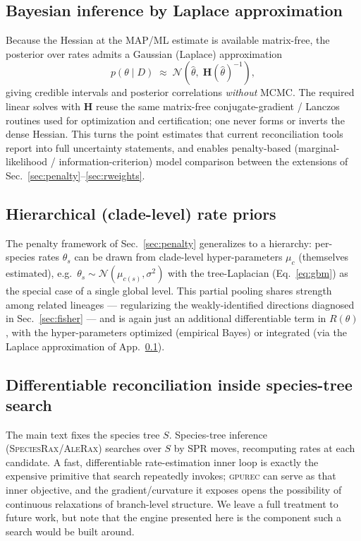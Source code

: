 \documentclass[11pt]{article}
\newcommand{\toolname}{\textsc{gpurec}\xspace}
\newcommand{\Hess}{\mathbf{H}}
\begin{document}
\subsection{Bayesian inference by Laplace approximation}
\label{app:laplace}
Because the Hessian at the MAP/ML estimate is available matrix-free, the
posterior over rates admits a Gaussian (Laplace) approximation
\begin{equation}
  p(\theta \mid D) \;\approx\; \mathcal{N}\!\left(\hat\theta,\; \Hess(\hat\theta)^{-1}\right),
  \label{eq:laplace}
\end{equation}
giving credible intervals and posterior correlations \emph{without} MCMC. The
required linear solves with $\Hess$ reuse the same matrix-free conjugate-gradient
/ Lanczos routines used for optimization and certification; one never forms or
inverts the dense Hessian. This turns the point estimates that current
reconciliation tools report into full uncertainty statements, and enables
penalty-based (marginal-likelihood / information-criterion) model comparison
between the extensions of Sec.~\ref{sec:penalty}--\ref{sec:rweights}.

\subsection{Hierarchical (clade-level) rate priors}
\label{app:hier}
The penalty framework of Sec.~\ref{sec:penalty} generalizes to a hierarchy:
per-species rates $\theta_s$ can be drawn from clade-level hyper-parameters
$\mu_c$ (themselves estimated), e.g.\ $\theta_s \sim \mathcal{N}(\mu_{c(s)},
\sigma^2)$ with the tree-Laplacian (Eq.~\eqref{eq:gbm}) as the special case of a
single global level. This partial pooling shares strength among related lineages
--- regularizing the weakly-identified directions diagnosed in
Sec.~\ref{sec:fisher} --- and is again just an additional differentiable term in
$R(\theta)$, with the hyper-parameters optimized (empirical Bayes) or integrated
(via the Laplace approximation of App.~\ref{app:laplace}).

\subsection{Differentiable reconciliation inside species-tree search}
\label{app:treesearch}
The main text fixes the species tree $S$. Species-tree inference
(\textsc{SpeciesRax}/\textsc{AleRax}) searches over $S$ by SPR moves, recomputing
rates at each candidate. A fast, differentiable rate-estimation inner loop is
exactly the expensive primitive that search repeatedly invokes; \toolname can
serve as that inner objective, and the gradient/curvature it exposes opens the
possibility of continuous relaxations of branch-level structure. We leave a full
treatment to future work, but note that the engine presented here is the
component such a search would be built around.
\end{document}
